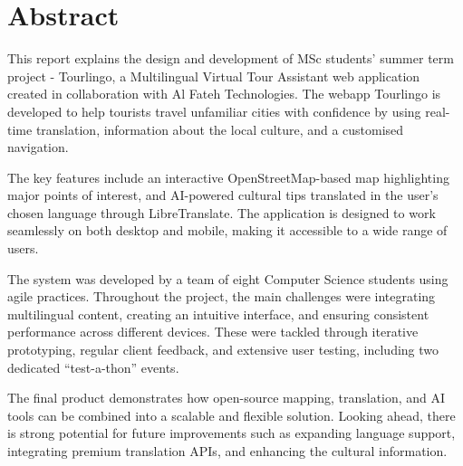 \chapter*{Abstract}

This report explains the design and development of MSc students' summer term project - Tourlingo, a Multilingual Virtual Tour Assistant web application created in collaboration with Al Fateh Technologies. The webapp Tourlingo is developed to help tourists travel unfamiliar cities with confidence by using real-time translation, information about the local culture, and a customised navigation.

The key features include an interactive OpenStreetMap-based map highlighting major points of interest, and AI-powered cultural tips translated in the user’s chosen language through LibreTranslate. The application is designed to work seamlessly on both desktop and mobile, making it accessible to a wide range of users.

The system was developed by a team of eight Computer Science students using agile practices. Throughout the project, the main challenges were integrating multilingual content, creating an intuitive interface, and ensuring consistent performance across different devices. These were tackled through iterative prototyping, regular client feedback, and extensive user testing, including two dedicated “test-a-thon” events.

The final product demonstrates how open-source mapping, translation, and AI tools can be combined into a scalable and flexible solution. Looking ahead, there is strong potential for future improvements such as expanding language support, integrating premium translation APIs, and enhancing the cultural information.